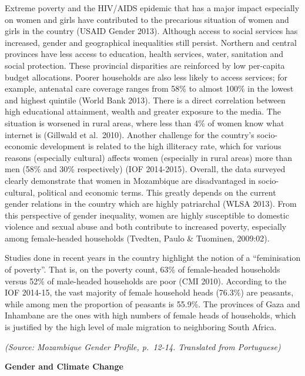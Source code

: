 \documentclass[
]{book}
\begin{document}
Extreme poverty and the HIV/AIDS epidemic that has a major impact especially on women and girls have contributed to the precarious situation of women and girls in the country (USAID Gender 2013). Although access to social services has increased, gender and geographical inequalities still persist. Northern and central provinces have less access to education, health services, water, sanitation and social protection. These provincial disparities are reinforced by low per-capita budget allocations. Poorer households are also less likely to access services; for example, antenatal care coverage ranges from 58\% to almost 100\% in the lowest and highest quintile (World Bank 2013). There is a direct correlation between high educational attainment, wealth and greater exposure to the media. The situation is worsened in rural areas, where less than 4\% of women know what internet is (Gillwald et al.~2010). Another challenge for the country's socio-economic development is related to the high illiteracy rate, which for various reasons (especially cultural) affects women (especially in rural areas) more than men (58\% and 30\% respectively) (IOF 2014-2015). Overall, the data surveyed clearly demonstrate that women in Mozambique are disadvantaged in socio-cultural, political and economic terms. This greatly depends on the current gender relations in the country which are highly patriarchal (WLSA 2013). From this perspective of gender inequality, women are highly susceptible to domestic violence and sexual abuse and both contribute to increased poverty, especially among female-headed households (Tvedten, Paulo \& Tuominen, 2009:02).

Studies done in recent years in the country highlight the notion of a ``feminisation of poverty''. That is, on the poverty count, 63\% of female-headed households versus 52\% of male-headed households are poor (CMI 2010). According to the IOF 2014-15, the vast majority of female household heads (76.3\%) are peasants, while among men the proportion of peasants is 55.9\%. The provinces of Gaza and Inhambane are the ones with high numbers of female heads of households, which is justified by the high level of male migration to neighboring South Africa.

\emph{(Source: Mozambique Gender Profile, p.~12-14. Translated from Portuguese)}

\textbf{Gender and Climate Change}
\end{document}
